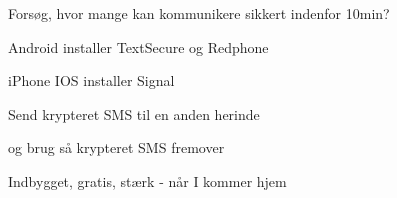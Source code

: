 \documentclass[20pt,landscape,a4paper,footrule]{foils}
\begin{document}


Forsøg, hvor mange kan kommunikere sikkert indenfor 10min?

\begin{list2}
\item Android installer TextSecure og Redphone
\item iPhone IOS installer Signal
\end{list2}

\vskip 1cm
\centerline{Send krypteret SMS til en anden herinde}

og brug så krypteret SMS fremover \smiley



\centerline{Indbygget, gratis, stærk - når I kommer hjem}


\myquestionspage
\end{document}
